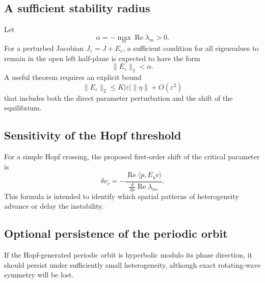 \documentclass[11pt, reqno]{amsart}
\theoremstyle{definition}
\theoremstyle{remark}
\newcommand{\eps}{\varepsilon}
\newcommand{\Ree}{\operatorname{Re}}
\newcommand{\dd}{\,\mathrm{d}}
\begin{document}

\subsection{A sufficient stability radius}

Let
\begin{equation}
\label{eq:stability-margin}
    \alpha
    =
    -\max_m\Ree\lambda_m>0.
\end{equation}
For a perturbed Jacobian $J_\eps=J+E_\eps$, a sufficient condition for all
eigenvalues to remain in the open left half-plane is expected to have the form
\begin{equation}
\label{eq:stability-radius}
    \|E_\eps\|_2<\alpha.
\end{equation}
A useful theorem requires an explicit bound
\[
    \|E_\eps\|_2
    \le
    K|\eps|\|\eta\|+O(\eps^2)
\]
that includes both the direct parameter perturbation and the shift of the
equilibrium.


\subsection{Sensitivity of the Hopf threshold}

For a simple Hopf crossing, the proposed first-order shift of the critical
parameter is
\begin{equation}
\label{eq:hopf-threshold-shift}
    \delta\nu_c
    =
    -
    \frac{
        \Ree\langle p,E_\eta v\rangle
    }{
        \frac{\dd}{\dd\nu}\Ree\lambda_{m_*}
    }.
\end{equation}
This formula is intended to identify which spatial patterns of heterogeneity
advance or delay the instability.


\subsection{Optional persistence of the periodic orbit}

If the Hopf-generated periodic orbit is hyperbolic modulo its phase direction,
it should persist under sufficiently small heterogeneity, although exact
rotating-wave symmetry will be lost.
\end{document}
